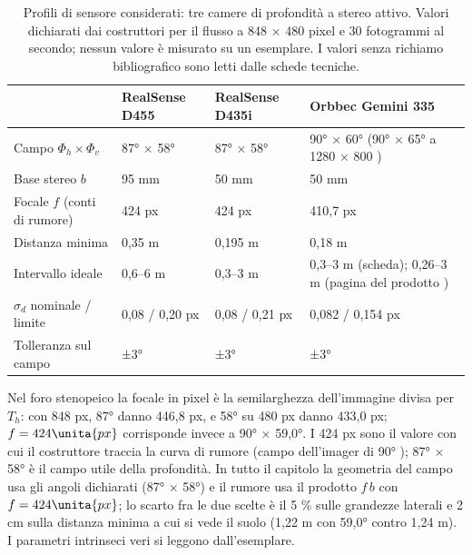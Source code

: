 \begin{table}[htb]\centering\small
\caption{Profili di sensore considerati: tre camere di profondità a stereo attivo. Valori dichiarati dai costruttori per il flusso a 848 × 480 pixel e 30 fotogrammi al secondo; nessun valore è misurato su un esemplare. I valori senza richiamo bibliografico sono letti dalle schede tecniche.}\label{tab:geo-profili}
\begin{tabularx}{\textwidth}{@{}p{4.1cm}p{2.9cm}p{3.3cm}L@{}}
\toprule
 & RealSense D455 & RealSense D435i & Orbbec Gemini 335\\
\midrule
Campo $\Phi_h\times\Phi_v$ & 87° × 58° \cite{realsense-d455} & 87° × 58° \cite{realsense-confronto-camere} & 90° × 60° (90° × 65° a 1280 × 800 \cite{orbbec-gemini-335})\\
Base stereo $b$ & 95 mm \cite{realsense-d455} & 50 mm \cite{realsense-taratura-profondita} & 50 mm \cite{orbbec-gemini-335}\\
Focale $f$ (conti di rumore) & 424 px & 424 px \cite{realsense-taratura-profondita} & 410,7 px\\
Distanza minima & 0,35 m & 0,195 m & 0,18 m\\
Intervallo ideale & 0,6--6 m \cite{realsense-d455} & 0,3--3 m \cite{realsense-confronto-camere} & 0,3--3 m (scheda); 0,26--3 m (pagina del prodotto \cite{orbbec-gemini-335})\\
$\sigma_d$ nominale / limite & 0,08 / 0,20 px & 0,08 / 0,21 px & 0,082 / 0,154 px\\
Tolleranza sul campo & ±3° & ±3° & ±3°\\
\bottomrule
\end{tabularx}
\end{table}

\begin{osservazione}\label{oss:geo-focale}
Nel foro stenopeico la focale in pixel è la semilarghezza dell'immagine divisa per $T_h$: con 848 px, 87° danno 446,8 px, e 58° su 480 px danno 433,0 px; $f=424\unita{px}$ corrisponde invece a 90° × 59,0°. I 424 px sono il valore con cui il costruttore traccia la curva di rumore (campo dell'imager di 90° \cite{realsense-taratura-profondita}); 87° × 58° è il campo utile della profondità. In tutto il capitolo la geometria del campo usa gli angoli dichiarati (87° × 58°) e il rumore usa il prodotto $f\,b$ con $f=424\unita{px}$; lo scarto fra le due scelte è il 5 \% sulle grandezze laterali e 2 cm sulla distanza minima a cui si vede il suolo (1,22 m con 59,0° contro 1,24 m). I parametri intrinseci veri si leggono dall'esemplare. 
\end{osservazione}

